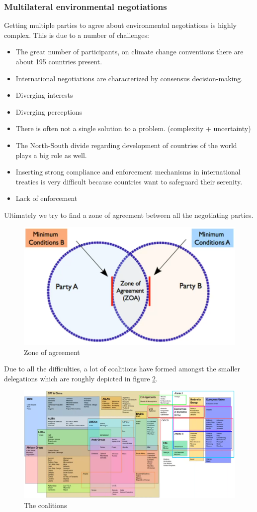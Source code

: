 \documentclass[../summary.tex]{subfiles}
\begin{document}
		\subsubsection{Multilateral environmental negotiations}
			Getting multiple parties to agree about environmental negotiations is highly complex. This is due to a number of challenges:
			\begin{itemize}
				\item The great number of participants, on climate change conventions there are about 195 countries present. 
				\item International negotiations are characterized by consensus decision-making.
				\item Diverging interests
				\item Diverging perceptions
				\item There is often not a single solution to a problem. (complexity + uncertainty)
				\item The North-South divide regarding development of countries of the world plays a big role as well.
				\item  Inserting strong compliance and enforcement mechanisms in international treaties is very difficult because countries want to safeguard their serenity.
				\item Lack of enforcement 
			\end{itemize}
			Ultimately we try to find a zone of agreement between all the negotiating parties. \\
			
			\begin{figure}[h]
				\centering
				\includegraphics[width=0.4\linewidth]{../images/13-ZOA.png}
				\caption{Zone of agreement}
				\label{fig:13-ZOA}
			\end{figure}
			Due to all the difficulties, a lot of coalitions have formed amongst the smaller delegations which are roughly depicted in figure \ref{fig:13-coalitions}.
			\begin{figure}[h]
				\centering
				\includegraphics[width=0.7\linewidth]{../images/13-coalitions.png}
				\caption{The coalitions}
				\label{fig:13-coalitions}
			\end{figure}
		
\end{document}
